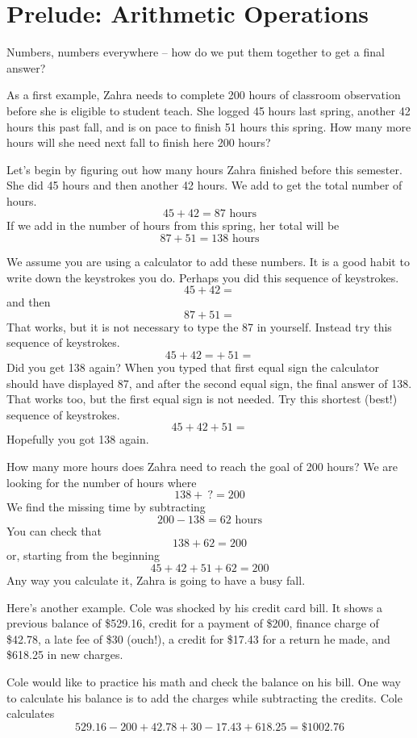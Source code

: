 
\section{Prelude: Arithmetic Operations}

Numbers, numbers everywhere -- how do we put them together to get a final answer?

As a first example, Zahra needs to complete 200 hours of classroom observation before she is eligible to student teach.  She logged 45 hours last spring, another 42 hours this past fall, and is on pace to finish 51 hours this spring.  How many more hours will she need next fall to finish here 200 hours? 

Let's begin by figuring out how many hours Zahra finished before this semester.  She did 45 hours and then another 42 hours.  We add to get the total number of hours.  $$45 + 42 = 87 \text{ hours}$$
If we add in the number of hours from this spring, her total will be $$87 + 51 = 138 \text{ hours}$$

We assume you are using a calculator to add these numbers.  It is a good habit to write down the keystrokes you do.   Perhaps you did this sequence of keystrokes.
$$45 + 42 = $$
and then $$87 + 51 =$$
That works, but it is not necessary to type the 87 in yourself.  Instead try this sequence of keystrokes.
$$45 + 42 = + ~51 =$$
Did you get 138 again?  When you typed that first equal sign the calculator should have displayed 87, and after the second equal sign, the final answer of 138.
That works too, but the first equal sign is not needed.  Try this shortest (best!) sequence of keystrokes.
$$45 + 42 + 51 =$$
Hopefully you got 138 again.  

How many more hours does Zahra need to reach the goal of 200 hours?  We are looking for the number of hours where $$138 + ~? = 200$$
We find the missing time by subtracting
$$200 - 138 = 62 \text{ hours}$$
You can check that
$$138 + 62 = 200$$
or, starting from the beginning
$$45 + 42 + 51+ 62 = 200$$
Any way you calculate it, Zahra is going to have a busy fall.

Here's another example.  Cole was shocked by his credit card bill.  It shows a previous balance of \$529.16, credit for a payment of \$200, finance charge of \$42.78, a late fee of \$30 (ouch!), a credit for \$17.43 for a return he made, and \$618.25 in new charges.  

Cole would like to practice his math and check the balance on his bill.  One way to calculate his balance is to add the charges while subtracting the credits. Cole calculates
$$529.16 - 200 + 42.78 + 30 - 17.43 + 618.25 = \$1002.76$$

